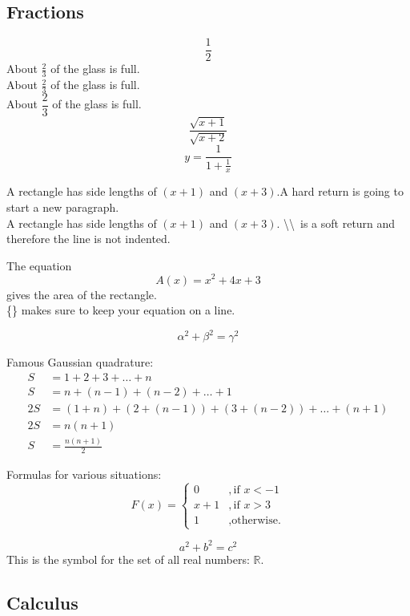 \documentclass[12pt, a4paper]{article}
\begin{document}
\subsection{Fractions}
$$\frac{1}{2}$$
About $\displaystyle \frac{2}{3}$ of the glass is full.\\[12pt]
About $\frac{2}{3}$ of the glass is full.\\[6pt]
About $\dfrac{2}{3}$ of the glass is full.
$$\frac{\sqrt{x+1}}{\sqrt{x+2}}$$
$$y=\frac{1}{  1+\frac{1}{x}  }$$

A rectangle has side lengths of $(x+1)$ and $(x+3)$.A hard return is going to start a new paragraph.\\
A rectangle has side lengths of $(x+1)$ and $(x+3)$. \textbackslash\textbackslash\ is a soft return and therefore the line is not indented.

The equation $${A(x)=x^2+4x+3}$$ gives the area of the rectangle.\\
\{\} makes sure to keep your equation on a line.\cite{trevisanato2000tea}

\begin{equation}\label{eq0}
    \alpha^2+\beta^2=\gamma^2
\end{equation}

Famous Gaussian quadrature:
\begin{equation*}
    \begin{split}
        S&=1+2+3+\dots+n\\
        S&=n+(n-1)+(n-2)+\dots+1\\
        2S&=(1+n)+(2+(n-1))+(3+(n-2))+\dots+(n+1)\\
        2S&=n(n+1)\\
        S&=\frac{n(n+1)}{2} 
    \end{split}
\end{equation*}

Formulas for various situations:
\begin{equation}
    F(x)=
    \begin{cases}
        0&,\text{if $x<-1$}\\
        x+1&,\text{if $x>3$}\\
        1&,\text{otherwise.}
    \end{cases}
\end{equation}

\[
    a^2+b^2=c^2
\]
This is the symbol for the set of all real numbers: $\mathbb{R}$.

\subsection{Calculus}
\end{document}
